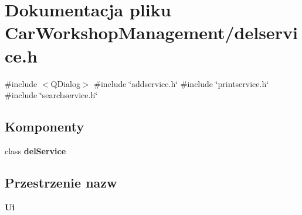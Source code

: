 \section{Dokumentacja pliku Car\+Workshop\+Management/delservice.h}
\label{delservice_8h}
{\ttfamily \#include $<$Q\+Dialog$>$}\newline
{\ttfamily \#include \char`\"{}addservice.\+h\char`\"{}}\newline
{\ttfamily \#include \char`\"{}printservice.\+h\char`\"{}}\newline
{\ttfamily \#include \char`\"{}searchservice.\+h\char`\"{}}\newline
\subsection*{Komponenty}
\begin{DoxyCompactItemize}
\item 
class \textbf{ del\+Service}
\end{DoxyCompactItemize}
\subsection*{Przestrzenie nazw}
\begin{DoxyCompactItemize}
\item 
 \textbf{ Ui}
\end{DoxyCompactItemize}
